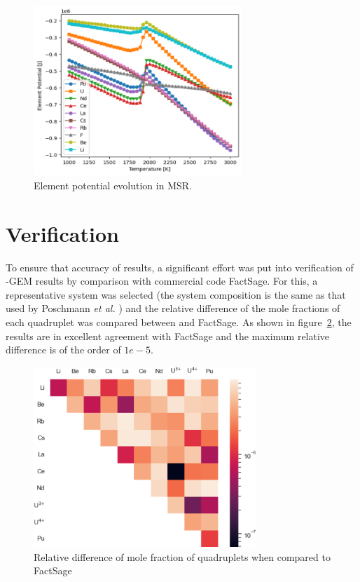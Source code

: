 \begin{figure}
         \centering
         \includegraphics[width=0.7\textwidth]{figures/chapter-7/ep_msr.png}
         \caption{Element potential evolution in MSR.}
         \label{fig:res_epmsr}
 \end{figure}
 
\section{Verification}
To ensure that accuracy of results, a significant effort was put into verification of {\YJ}-GEM results by comparison with commercial code FactSage. For this, a representative system was selected (the system composition is the same as that used by Poschmann \textit{et al.} \cite{Poschmann:2021ab}) and the relative difference of the mole fractions of each quadruplet was compared between {\YJ} and FactSage. As shown in figure~\ref{fig:verif}, the results are in excellent agreement with FactSage and the maximum relative difference is of the order of $1e-5$.
 \begin{figure}[h!]
        \centering
        \includegraphics[width=0.75\textwidth]{figures/chapter-7/verif.png}
        \caption{Relative difference of mole fraction of quadruplets when compared to FactSage}
        \label{fig:verif}
    \end{figure}